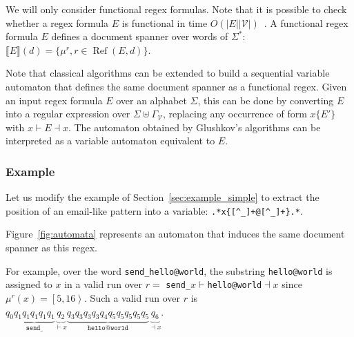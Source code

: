 \documentclass[12px]{article}
\theoremstyle{definition}
\DeclareMathOperator{\Ref}{Ref}
\newcommand{\Span}[1]{\left[ #1 \right\rangle}
\begin{document}
        We will only consider functional regex formulas. Note that it is
        possible to check whether a regex formula $E$ is functional in time
        $O(|E| |\mathcal{V}|)$~\cite{peterfreund}. A functional regex formula
        $E$ defines a document spanner over words of $\Sigma^*$: $\llbracket E
        \rrbracket (d) = \{\mu^r, r \in \Ref(E, d)\}$.

        Note that classical algorithms can be extended to build a sequential
        variable automaton that defines the same document spanner as a
        functional regex. Given an input regex formula $E$ over an alphabet
        $\Sigma$, this can be done by converting $E$ into a regular expression
        over $\Sigma \uplus \Gamma_\mathcal{V}$, replacing any occurrence of
        form $x\{E'\}$ with $x{\vdash} E {\dashv}x$. The automaton obtained by
        Glushkov's algorithms can be interpreted as a variable automaton
        equivalent to $E$.

      \subsubsection{Example}

        Let us modify the example of Section~\ref{sec:example_simple} to extract
        the position of an email-like pattern into a variable:
        \texttt{.*x\{[\textasciicircum\_]+@[\textasciicircum\_]+\}.*}.

        Figure~\ref{fig:automata} represents an automaton that induces the same
        document spanner as this regex.

        For example, over the word \texttt{send\_hello@world}, the substring
        \texttt{hello@world} is assigned to $x$ in a valid run over $r =$
        \texttt{send\_$x{\vdash}$hello@world${\dashv}x$} since $\mu^r(x) =
        \Span{5, 16}$. Such a valid run over $r$ is $q_0 \underbrace{q_1 q_1 q_1
        q_1 q_1}_\texttt{send\_} \underbrace{q_2}_{{\vdash}x} \underbrace{q_3 q_3
        q_3 q_3 q_4 q_5 q_5 q_5 q_5 q_5}_\texttt{hello@world}
        \underbrace{q_6}_{{\dashv}x}$.
\end{document}
